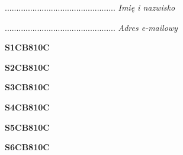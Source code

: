 \begin{turn}{90}\begin{minipage}{\linewidth} \vspace{20mm} ................................................  \textit{Imię i nazwisko}\end{minipage}\end{turn}

\begin{turn}{90}\begin{minipage}{\linewidth} \vspace{20mm} ................................................  \textit{Adres e-mailowy}\end{minipage}\end{turn}

\begin{turn}{90}\huge \begin{minipage}{\linewidth} \vspace{10mm}\textbf{S1CB810C}\end{minipage}\end{turn}

\begin{turn}{90}\huge \begin{minipage}{\linewidth} \vspace{10mm}\textbf{S2CB810C}\end{minipage}\end{turn}

\begin{turn}{90}\huge \begin{minipage}{\linewidth} \vspace{10mm}\textbf{S3CB810C}\end{minipage}\end{turn}

\begin{turn}{90}\huge \begin{minipage}{\linewidth} \vspace{10mm}\textbf{S4CB810C}\end{minipage}\end{turn}

\begin{turn}{90}\huge \begin{minipage}{\linewidth} \vspace{10mm}\textbf{S5CB810C}\end{minipage}\end{turn}

\begin{turn}{90}\huge \begin{minipage}{\linewidth} \vspace{10mm}\textbf{S6CB810C}\end{minipage}\end{turn}


